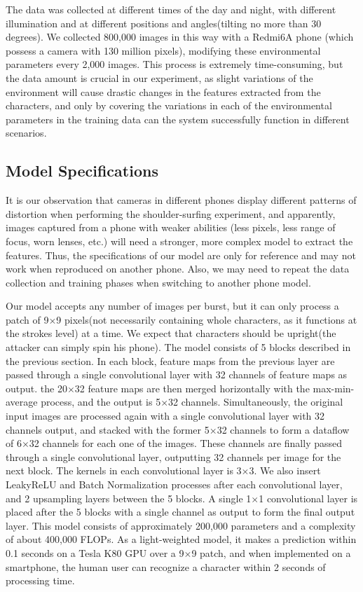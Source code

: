 The data was collected at different times of the day and night, with different illumination and at different positions and angles(tilting no more than 30 degrees). We collected 800,000 images in this way with a Redmi6A phone (which possess a camera with 130 million pixels), modifying these environmental parameters every 2,000 images. This process is extremely time-consuming, but the data amount is crucial in our experiment, as slight variations of the environment will cause drastic changes in the features extracted from the characters, and only by covering the variations in each of the environmental parameters in the training data can the system successfully function in different scenarios.

\subsection{Model Specifications}
It is our observation that cameras in different phones display different patterns of distortion when performing the shoulder-surfing experiment, and apparently, images captured from a phone with weaker abilities (less pixels, less range of focus, worn lenses, etc.) will need a stronger, more complex model to extract the features. Thus, the specifications of our model are only for reference and may not work when reproduced on another phone. Also, we may need to repeat the data collection and training phases when switching to another phone model.

Our model accepts any number of images per burst, but it can only process a patch of 9$\times$9 pixels(not necessarily containing whole characters, as it functions at the strokes level) at a time. We expect that characters should be upright(the attacker can simply spin his phone). The model consists of 5 blocks described in the previous section. In each block, feature maps from the previous layer are passed through a single convolutional layer with 32 channels of feature maps as output. the 20$\times$32 feature maps are then merged horizontally with the max-min-average process, and the output is 5$\times$32 channels. Simultaneously, the original input images are processed again with a single convolutional layer with 32 channels output, and stacked with the former 5$\times$32 channels to form a dataflow of 6$\times$32 channels for each one of the images. These channels are finally passed through a single convolutional layer, outputting 32 channels per image for the next block. The kernels in each convolutional layer is 3$\times$3. We also insert LeakyReLU and Batch Normalization processes after each convolutional layer, and 2 upsampling layers between the 5 blocks. A single 1$\times$1 convolutional layer is placed after the 5 blocks with a single channel as output to form the final output layer. This model consists of approximately 200,000 parameters and a complexity of about 400,000 FLOPs. As a light-weighted model, it makes a prediction within 0.1 seconds on a Tesla K80 GPU over a 9$\times$9 patch, and when implemented on a smartphone, the human user can recognize a character within 2 seconds of processing time.